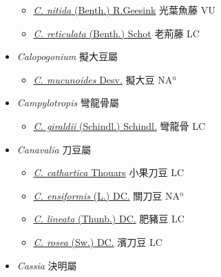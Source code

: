 \begin{itemize}
  \begin{itemize}
        \item[] \href{http://www.theplantlist.org/tpl1.1/search?q=Callerya+nitida}{\textit{C. nitida} (Benth.) R.Geesink}   光葉魚藤 VU
        \item[] \href{http://www.theplantlist.org/tpl1.1/search?q=Callerya+reticulata}{\textit{C. reticulata} (Benth.) Schot}   老荊藤 LC
  \end{itemize}
 \item[] \textit{Calopogonium} 擬大豆屬
                    
  \begin{itemize}
        \item[] \href{http://www.theplantlist.org/tpl1.1/search?q=Calopogonium+mucunoides}{\textit{C. mucunoides} Desv.}   擬大豆 NA$^n$
  \end{itemize}
 \item[] \textit{Campylotropis} 彎龍骨屬
                    
  \begin{itemize}
        \item[] \href{http://www.theplantlist.org/tpl1.1/search?q=Campylotropis+giraldii}{\textit{C. giraldii} (Schindl.) Schindl.}   彎龍骨 LC
  \end{itemize}
 \item[] \textit{Canavalia} 刀豆屬
                    
  \begin{itemize}
        \item[] \href{http://www.theplantlist.org/tpl1.1/search?q=Canavalia+cathartica}{\textit{C. cathartica} Thouars}   小果刀豆 LC
        \item[] \href{http://www.theplantlist.org/tpl1.1/search?q=Canavalia+ensiformis}{\textit{C. ensiformis} (L.) DC.}   關刀豆 NA$^n$
        \item[] \href{http://www.theplantlist.org/tpl1.1/search?q=Canavalia+lineata}{\textit{C. lineata} (Thunb.) DC.}   肥豬豆 LC
        \item[] \href{http://www.theplantlist.org/tpl1.1/search?q=Canavalia+rosea}{\textit{C. rosea} (Sw.) DC.}   濱刀豆 LC
  \end{itemize}
 \item[] \textit{Cassia} 決明屬
                    

\end{itemize}
